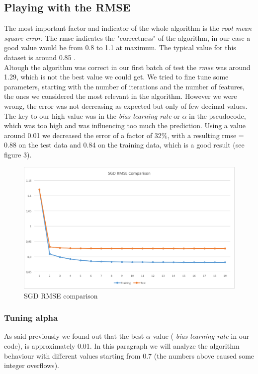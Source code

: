 \documentclass{sig-alternate-05-2015}
\begin{document}
\subsection{Playing with the RMSE}
The most important factor and indicator of the whole algorithm is the \textit{root mean
square error}. The rmse indicates the "correctness" of the algorithm, in our case
a good value would be from 0.8 to 1.1 at maximum. The typical value for this dataset
is around 0.85 \cite{mymedialite}.\\
Altough the algorithm was correct in our first batch of test the \textit{rmse} was
around 1.29, which is not the best value we could get. We tried to fine tune some
parameters, starting with the number of iterations and the number of features, the ones
we considered the most relevant in the algorithm. However we were wrong, the
error was not decreasing as expected but only of few decimal values.
The key to our high value was in the \textit{bias learning rate} or $\alpha$ in the pseudocode,
which was too high and was influencing too much the prediction. Using a value around 0.01 we decreased
the error of a factor of 32$\%$, with a resulting rmse = 0.88 on the test data and 0.84 on the training data,
which is a good result (see figure 3).
\begin{figure}
    \caption{SGD RMSE comparison}
    \centering
    \includegraphics[scale=0.4]{sgdrmseserial.png}
\end{figure}

\subsubsection{Tuning alpha}
As said previously we found out that the best $\alpha$ value ( \textit{bias learning rate} in our code),
is approximately 0.01. In this paragraph we will analyze the algorithm behaviour with different values
starting from 0.7 (the numbers above caused some integer overflows).
\end{document}
